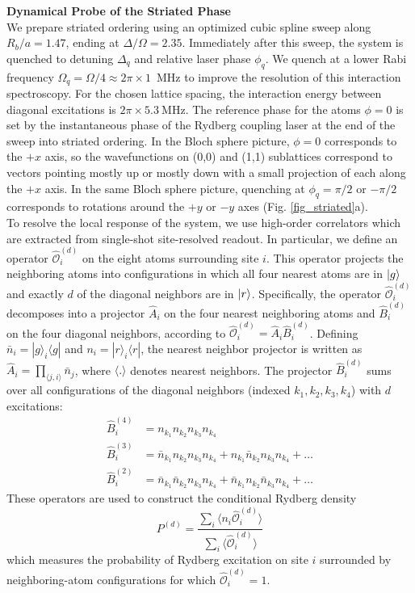 \documentclass[reprint,twocolumn,secnumarabic,amssymb, aps, prl]{revtex4-1}
\begin{document}
\noindent\textbf{Dynamical Probe of the Striated Phase}\\
We prepare striated ordering using an optimized cubic spline sweep along $R_b/a = 1.47$, ending at $\Delta/\Omega = 2.35$. Immediately after this sweep, the system is quenched to detuning $\Delta_q$ and relative laser phase $\phi_q$. We quench at a lower Rabi frequency $\Omega_q = \Omega/4 \approx 2\pi \times 1$~MHz to improve the resolution of this interaction spectroscopy. For the chosen lattice spacing, the interaction energy between diagonal excitations is $2\pi \times 5.3~$MHz. The reference phase for the atoms $\phi = 0$ is set by the instantaneous phase of the Rydberg coupling laser at the end of the sweep into striated ordering. In the Bloch sphere picture, $\phi = 0$ corresponds to the $+x$ axis, so the wavefunctions on (0,0) and (1,1) sublattices correspond to vectors pointing mostly up or mostly down with a small projection of each along the $+x$ axis. In the same Bloch sphere picture, quenching at $\phi_q = \pi/2$ or $-\pi/2$ corresponds to rotations around the $+y$ or $-y$ axes (Fig. \ref{fig_striated}a).\\

To resolve the local response of the system, we use high-order correlators which are extracted from single-shot site-resolved readout. In particular, we define an operator $\hat{\mathcal{O}}_i^{(d)}$ on the eight atoms surrounding site $i$. This operator projects the neighboring atoms into configurations in which all four nearest atoms are in $\ket{g}$ and exactly $d$ of the diagonal neighbors are in $\ket{r}$. Specifically, the operator $\hat{\mathcal{O}}_i^{(d)}$ decomposes into a projector $\hat{A}_i$ on the four nearest neighboring atoms and $\hat{B}_i^{(d)}$ on the four diagonal neighbors, according to $\hat{\mathcal{O}}_i^{(d)} = \hat{A}_i \hat{B}_i^{(d)}$. Defining $\bar{n}_i = |g\rangle_i\langle g|$ and $n_i = |r\rangle_i\langle r|$, the nearest neighbor projector is written as $\hat{A}_i = \prod_{\langle j, i \rangle } \bar{n}_j$, where $\langle . \rangle$ denotes nearest neighbors. The projector $\hat{B}_i^{(d)}$ sums over all configurations of the diagonal neighbors (indexed $k_1, k_2, k_3, k_4$) with $d$ excitations:
\begin{align}
\hat{B}_i^{(4)} &= n_{k_1}n_{k_2}n_{k_3}n_{k_4}  \\
\hat{B}_i^{(3)} &= \bar{n}_{k_1}n_{k_2}n_{k_3}n_{k_4} + n_{k_1}\bar{n}_{k_2}n_{k_3}n_{k_4} + \ldots \\
\hat{B}_i^{(2)} &= \bar{n}_{k_1}\bar{n}_{k_2}n_{k_3}n_{k_4} + \bar{n}_{k_1}{n}_{k_2}\bar{n}_{k_3}n_{k_4} + \ldots
\end{align}
These operators are used to construct the conditional Rydberg density  $$P^{(d)} = \frac{\sum_i \langle n_i \hat{\mathcal{O}}_i^{(d)}\rangle}{\sum_i \langle \hat{\mathcal{O}}_i^{(d)} \rangle}$$ which measures the probability of Rydberg excitation on site $i$ surrounded by neighboring-atom configurations for which $\hat{\mathcal{O}}_i^{(d)}=1$.
\end{document}
